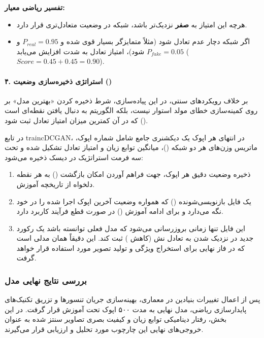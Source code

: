 \documentclass{article}
\begin{document}
\textbf{تفسیر ریاضی معیار:}
\begin{itemize}
	\item هرچه این امتیاز به \textbf{صفر} نزدیک‌تر باشد، شبکه در وضعیت متعادل‌تری قرار دارد.
	\item اگر شبکه دچار عدم تعادل شود (مثلاً متمایزگر بسیار قوی شده و $P_{real}=0.95$ و $P_{fake}=0.05$ شود)، امتیاز تعادل به شدت افزایش می‌یابد ($Score = 0.45 + 0.45 = 0.90$).
\end{itemize}

\paragraph{۴. استراتژی ذخیره‌سازی وضعیت ()}
بر خلاف رویکردهای سنتی، در این پیاده‌سازی، شرط ذخیره کردن «بهترین مدل» بر روی کمینه‌سازی خطای مولد استوار نیست، بلکه الگوریتم به دنبال یافتن نقطه‌ای است که در آن کمترین میزان امتیاز تعادل ثبت شود (). 

در تابع traincDCGAN، در انتهای هر اپوک یک دیکشنری جامع شامل شماره اپوک، ماتریس وزن‌های هر دو شبکه ()، میانگین توابع زیان و امتیاز تعادل تشکیل شده و تحت سه فرمت استراتژیک در دیسک ذخیره می‌شود:
\begin{enumerate}
	\item {} ذخیره وضعیت دقیق هر اپوک، جهت فراهم آوردن امکان بازگشت () به هر نقطه دلخواه از تاریخچه آموزش.
	\item {} یک فایل بازنویسی‌شونده () که همواره وضعیت آخرین اپوک اجرا شده را در خود نگه می‌دارد و برای ادامه آموزش () در صورت قطع فرآیند کاربرد دارد.
	\item {} این فایل تنها زمانی بروزرسانی می‌شود که مدل فعلی توانسته باشد یک رکورد جدید در نزدیک شدن به تعادل نش (کاهش ) ثبت کند. این دقیقاً همان مدلی است که در فاز نهایی برای استخراج ویژگی و تولید تصویر مورد استفاده قرار خواهد گرفت.
\end{enumerate}


\subsubsection{بررسی نتایج نهایی مدل}

پس از اعمال تغییرات بنیادین در معماری، بهینه‌سازی جریان تنسورها و تزریق تکنیک‌های پایدارسازی ریاضی، مدل نهایی به مدت ۵۰۰ اپوک تحت آموزش قرار گرفت. در این بخش، رفتار دینامیکی توابع زیان و کیفیت بصری تصاویر سنتز شده به عنوان خروجی‌های نهایی این چارچوب مورد تحلیل و ارزیابی قرار می‌گیرند.
\end{document}

